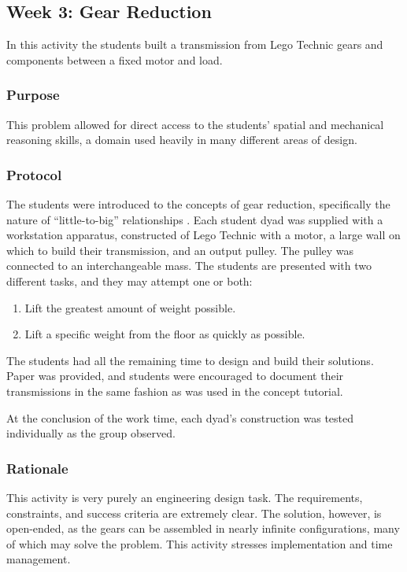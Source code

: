 \subsection{Week 3: Gear Reduction}

	In this activity the students built a transmission from Lego
	Technic gears and components between a fixed motor and load. 
	
	
	\subsubsection{Purpose}
	
	This problem allowed for direct access to the students' spatial and
	mechanical reasoning skills, a domain used heavily in many different
	areas of design.
	
	
	\subsubsection{Protocol}
	
	The students were introduced to the concepts of gear reduction,
	specifically the nature of {}``little-to-big'' relationships \citet{ArtofLEGO}.
	Each student dyad was supplied with a workstation apparatus, constructed
	of Lego Technic with a motor, a large wall on which to build their
	transmission, and an output pulley. The pulley was connected to
	an interchangeable mass. The students are presented with two different
	tasks, and they may attempt one or both:
	\begin{enumerate}
	\item Lift the greatest amount of weight possible.
	\item Lift a specific weight from the floor as quickly as possible.
	\end{enumerate}
	The students had all the remaining time to design and build
	their solutions. Paper was provided, and students were encouraged
	to document their transmissions in the same fashion as was used in
	the concept tutorial.
	
	At the conclusion of the work time, each dyad's construction was tested individually as the group observed.
	
	
	\subsubsection{Rationale}
	
	This activity is very purely an engineering design task. The requirements,
	constraints, and success criteria are extremely clear. The solution,
	however, is open-ended, as the gears can be assembled in nearly infinite
	configurations, many of which may solve the problem. This activity
	stresses implementation and time management.

